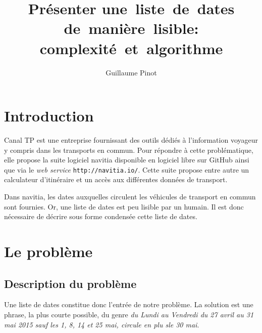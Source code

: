 \documentclass{roadef}
\begin{document}
\title{Présenter une~liste~de~dates de~manière~lisible: complexité~et~algorithme}

\def\shorttitle{Présenter une~liste~de~dates de~manière~lisible}

\author{Guillaume Pinot}

{}

\maketitle
\thispagestyle{empty}



\section{Introduction}

Canal TP est une entreprise fournissant des outils dédiés à
l'information voyageur y compris dans les transports en commun. Pour répondre à
cette problématique, elle propose la suite logiciel navitia disponible
en logiciel libre sur GitHub ainsi que via le \emph{web service}
\texttt{http://navitia.io/}. Cette suite propose entre autre un
calculateur d'itinéraire et un accès aux différentes données de
transport.

Dans navitia, les dates auxquelles circulent les véhicules de transport en commun sont
fournies.  Or, une liste de dates est peu lisible par un humain. Il
est donc nécessaire de décrire sous forme condensée cette liste de
dates.

\section{Le problème}

\subsection{Description du problème}

Une liste de dates constitue donc l'entrée de notre problème. La
solution est une phrase, la plus courte possible, du genre \emph{du
  Lundi au Vendredi du 27 avril au 31 mai 2015 sauf les 1, 8, 14 et 25
  mai, circule en plu sle 30 mai}.
\end{document}
